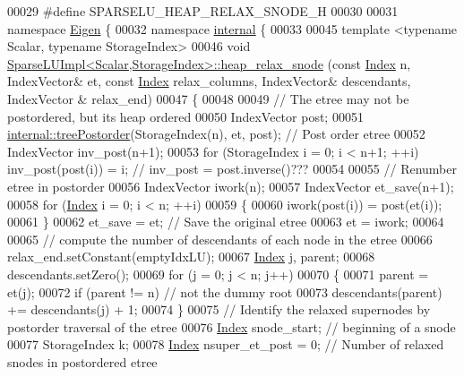 \begin{DoxyCode}
00029 \textcolor{preprocessor}{#define SPARSELU\_HEAP\_RELAX\_SNODE\_H}
00030 
00031 \textcolor{keyword}{namespace }\hyperlink{namespace_eigen}{Eigen} \{
00032 \textcolor{keyword}{namespace }\hyperlink{namespaceinternal}{internal} \{
00033 
00045 \textcolor{keyword}{template} <\textcolor{keyword}{typename} Scalar, \textcolor{keyword}{typename} StorageIndex>
00046 \textcolor{keywordtype}{void} \hyperlink{group___sparse_l_u___module_a88952ce33c968374b149e31d0539178d}{SparseLUImpl<Scalar,StorageIndex>::heap\_relax\_snode}
       (\textcolor{keyword}{const} \hyperlink{namespace_eigen_a62e77e0933482dafde8fe197d9a2cfde}{Index} n, IndexVector& et, \textcolor{keyword}{const} \hyperlink{namespace_eigen_a62e77e0933482dafde8fe197d9a2cfde}{Index} relax\_columns, IndexVector& descendants, IndexVector
      & relax\_end)
00047 \{
00048   
00049   \textcolor{comment}{// The etree may not be postordered, but its heap ordered  }
00050   IndexVector post;
00051   \hyperlink{namespace_eigen_1_1internal_ab414b5990bd6c865958a9231ff418d20}{internal::treePostorder}(StorageIndex(n), et, post); \textcolor{comment}{// Post order etree}
00052   IndexVector inv\_post(n+1); 
00053   \textcolor{keywordflow}{for} (StorageIndex i = 0; i < n+1; ++i) inv\_post(post(i)) = i; \textcolor{comment}{// inv\_post = post.inverse()???}
00054   
00055   \textcolor{comment}{// Renumber etree in postorder }
00056   IndexVector iwork(n);
00057   IndexVector et\_save(n+1);
00058   \textcolor{keywordflow}{for} (\hyperlink{namespace_eigen_a62e77e0933482dafde8fe197d9a2cfde}{Index} i = 0; i < n; ++i)
00059   \{
00060     iwork(post(i)) = post(et(i));
00061   \}
00062   et\_save = et; \textcolor{comment}{// Save the original etree}
00063   et = iwork; 
00064   
00065   \textcolor{comment}{// compute the number of descendants of each node in the etree}
00066   relax\_end.setConstant(emptyIdxLU);
00067   \hyperlink{namespace_eigen_a62e77e0933482dafde8fe197d9a2cfde}{Index} j, parent; 
00068   descendants.setZero();
00069   \textcolor{keywordflow}{for} (j = 0; j < n; j++) 
00070   \{
00071     parent = et(j);
00072     \textcolor{keywordflow}{if} (parent != n) \textcolor{comment}{// not the dummy root}
00073       descendants(parent) += descendants(j) + 1;
00074   \}
00075   \textcolor{comment}{// Identify the relaxed supernodes by postorder traversal of the etree}
00076   \hyperlink{namespace_eigen_a62e77e0933482dafde8fe197d9a2cfde}{Index} snode\_start; \textcolor{comment}{// beginning of a snode }
00077   StorageIndex k;
00078   \hyperlink{namespace_eigen_a62e77e0933482dafde8fe197d9a2cfde}{Index} nsuper\_et\_post = 0; \textcolor{comment}{// Number of relaxed snodes in postordered etree }

\end{DoxyCode}

